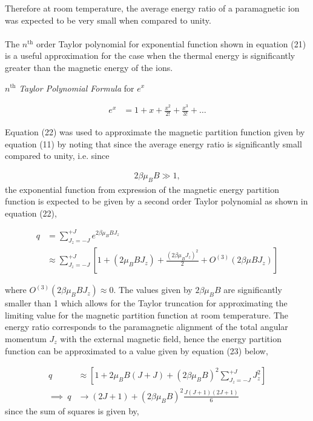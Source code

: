 \documentclass[a4paper,11pt]{article}
\begin{document}
Therefore at room temperature, the average energy ratio of a paramagnetic  ion was expected to be very small when compared to unity.\\
\\
The $n^{\text{th}}$ order Taylor polynomial for exponential function shown in equation (21) is a useful approximation for the case when the thermal energy is significantly greater than the magnetic energy of the ions.

\begin{center}
$n^{\text{th}}$ \textit{Taylor Polynomial Formula} for $e^{x}$
\end{center}   

\begin{align}
e^x	& = 1 + x + \frac{x^2}{2!} + \frac{x^3}{3!} + \ldots
\end{align}

Equation (22) was used to approximate the magnetic partition function given by equation (11) by noting that since the average energy ratio is significantly small compared to unity, i.e. since 

\begin{align}
2 \beta \mu_B B	\gg 1,\nonumber
\end{align}
the exponential function from expression of the magnetic energy partition function is expected to be given by a second order Taylor polynomial as shown in equation (22),

\begin{align}
q	& = \sum_{J_z = - J}^{+J} e^{2 \beta \mu_B B J_z}\nonumber\\
	& \approx \sum_{J_z = -J}^{+J} [1 + (2 \mu_B B J_z) + \frac{(2 \beta \mu_B J_z)^2}{2} + O^{(3)}(2 \beta \mu B J_z)] 
\end{align}

where $O^{(3)}(2 \beta \mu_B B J_z) \approx 0$. The values given by $2 \beta \mu_B B$ are significantly smaller than 1 which allows for the Taylor truncation for approximating the limiting value for the magnetic partition function at room temperature. The energy ratio corresponds to the paramagnetic alignment of the total angular momentum $J_z$ with the external magnetic field, hence the energy partition function can be approximated to a value given by equation (23) below,

\begin{align}
q	& \approx [1 + 2 \mu_B B (J + J) + (2 \beta \mu_B B)^2 \sum_{J_z = -J}^{+J} J_{z}^2]\nonumber\\
\implies~q	& \rightarrow (2J +1) + (2 \beta \mu_B B)^2\frac{J(J+1)(2J+1)}{6}
\end{align}
since the sum of squares is given by,
\end{document}
